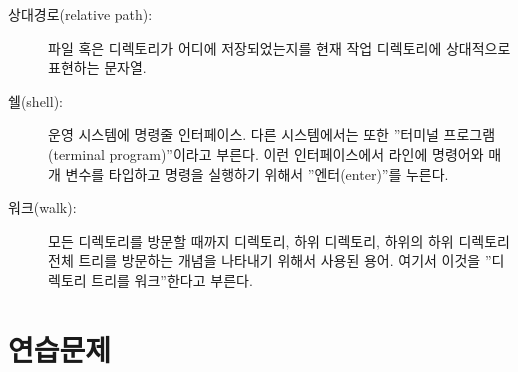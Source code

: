 \begin{description}
\item[상대경로(relative path):]
파일 혹은 디렉토리가 어디에 저장되었는지를 현재 작업 디렉토리에 상대적으로 표현하는 문자열.

\item[쉘(shell):]
운영 시스템에 명령줄 인터페이스. 다른 시스템에서는 또한 ''터미널 프로그램(terminal program)''이라고 부른다.
이런 인터페이스에서 라인에 명령어와 매개 변수를 타입하고 명령을 실행하기 위해서 ''엔터(enter)''를 누른다.

\item[워크(walk):]
모든 디렉토리를 방문할 때까지 디렉토리, 하위 디렉토리, 하위의 하위 디렉토리 전체 트리를 방문하는 개념을 나타내기 위해서 사용된 용어.
여기서 이것을 ''디렉토리 트리를 워크''한다고 부른다.

\end{description}


\section{연습문제}

